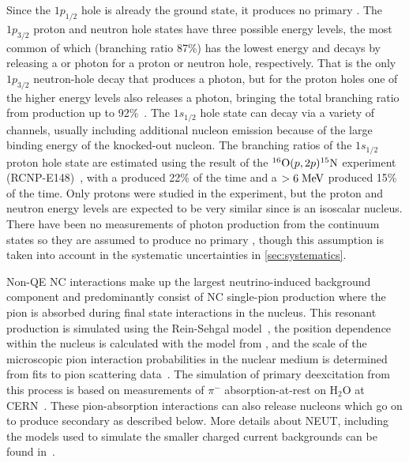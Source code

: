 \documentclass[
aps,
prd,
twocolumn,
superscriptaddress,
showpacs
]{revtex4-1}
\begin{document}
Since the $1p_{1/2}$ hole is already the ground state, it produces no primary \gmrs.  The $1p_{3/2}$ proton and neutron hole states have three possible energy levels, the most common of which (branching ratio 87\%) has the lowest energy and decays by releasing a  or  photon for a proton or neutron hole, respectively.  That is the only $1p_{3/2}$ neutron-hole decay that produces a photon, but for the proton holes one of the higher energy levels also releases a  photon, bringing the total branching ratio from \gmr production up to 92\%~\cite{Leuschner:1994zz,AjzenbergSelove:1991zz}.  
The $1s_{1/2}$ hole state can decay via a variety of channels, usually including additional nucleon emission because of the large binding energy of the knocked-out nucleon. The branching ratios of the $1s_{1/2}$ proton hole state are estimated using the result of the ${}^{16}\textrm{O}(p,2p){}^{15}\textrm{N}$ experiment (RCNP-E148)~\cite{Kobayashi:2006gb}, with a  \gmr produced 22\% of the time and a $>6 \; \mathrm{MeV}$ \gmr produced 15\% of the time.  Only protons were studied in the experiment, but the proton and neutron energy levels are expected to be very similar since  is an isoscalar nucleus.  There have been no measurements of photon production from the continuum states so they are assumed to produce no primary \gmrs, though this assumption is taken into account in the systematic uncertainties in \cref{sec:systematics}.

Non-QE NC interactions make up the largest neutrino-induced background component and predominantly consist of NC single-pion production where the pion is absorbed during final state interactions in the nucleus. This resonant production is simulated using the Rein-Sehgal model~\cite{Rein:1980wg}, the position dependence within the nucleus is calculated with the model from \cite{Oset:1982}, and the scale of the microscopic pion interaction probabilities in the nuclear medium is determined from fits to pion scattering data~\cite{Ashery:1981tq,Jones:1993ps,Giannelli:2000zy}.  The simulation of primary deexcitation \gmrs from this process is based on measurements of $\pi^-$ absorption-at-rest on H$_{2}$O at CERN~\cite{Engelhardt:1975ct}. These pion-absorption interactions can also release nucleons which go on to produce secondary \gmrs as described below.  More details about NEUT, including the models used to simulate the smaller charged current backgrounds can be found in~\cite{Abe:2011ks,Hayato:2002sd}.
\end{document}
